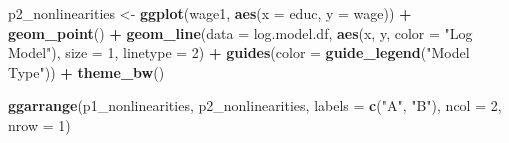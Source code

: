 \documentclass[]{book}
\newenvironment{Shaded}{\begin{snugshade}}{\end{snugshade}}
\newcommand{\CommentTok}[1]{\textcolor[rgb]{0.56,0.35,0.01}{\textit{#1}}}
\newcommand{\DataTypeTok}[1]{\textcolor[rgb]{0.13,0.29,0.53}{#1}}
\newcommand{\DecValTok}[1]{\textcolor[rgb]{0.00,0.00,0.81}{#1}}
\newcommand{\KeywordTok}[1]{\textcolor[rgb]{0.13,0.29,0.53}{\textbf{#1}}}
\newcommand{\NormalTok}[1]{#1}
\newcommand{\OperatorTok}[1]{\textcolor[rgb]{0.81,0.36,0.00}{\textbf{#1}}}
\newcommand{\StringTok}[1]{\textcolor[rgb]{0.31,0.60,0.02}{#1}}
\begin{document}
\begin{Shaded}
\end{Shaded}

\begin{Shaded}
\begin{Highlighting}[]
\NormalTok{p2_nonlinearities <-}\StringTok{ }\KeywordTok{ggplot}\NormalTok{(wage1, }\KeywordTok{aes}\NormalTok{(}\DataTypeTok{x =}\NormalTok{ educ, }\DataTypeTok{y =}\NormalTok{ wage))  }\OperatorTok{+}
\StringTok{  }\KeywordTok{geom_point}\NormalTok{()   }\OperatorTok{+}
\StringTok{  }\KeywordTok{geom_line}\NormalTok{(}\DataTypeTok{data =}\NormalTok{ log.model.df, }\KeywordTok{aes}\NormalTok{(x, y, }\DataTypeTok{color =} \StringTok{"Log Model"}\NormalTok{), }\DataTypeTok{size =} \DecValTok{1}\NormalTok{, }\DataTypeTok{linetype =} \DecValTok{2}\NormalTok{)  }\OperatorTok{+}
\StringTok{  }\KeywordTok{guides}\NormalTok{(}\DataTypeTok{color =} \KeywordTok{guide_legend}\NormalTok{(}\StringTok{"Model Type"}\NormalTok{)) }\OperatorTok{+}\StringTok{ }
\StringTok{  }\KeywordTok{theme_bw}\NormalTok{()}
\end{Highlighting}
\end{Shaded}

\begin{Shaded}
\begin{Highlighting}[]
\KeywordTok{ggarrange}\NormalTok{(p1_nonlinearities, p2_nonlinearities,  }
          \DataTypeTok{labels =} \KeywordTok{c}\NormalTok{(}\StringTok{"A"}\NormalTok{, }\StringTok{"B"}\NormalTok{),}
          \DataTypeTok{ncol =} \DecValTok{2}\NormalTok{, }\DataTypeTok{nrow =} \DecValTok{1}\NormalTok{)}
\end{Highlighting}
\end{Shaded}
\end{document}

